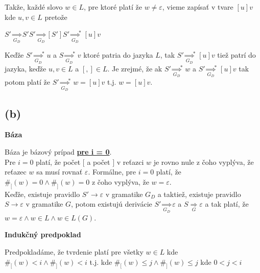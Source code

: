 \documentclass[11pt,a4paper]{article}
\begin{document}
Takže, každé slovo $w \in L$, pre ktoré platí že $w \neq \varepsilon$, vieme zapísať v tvare $[u]v$ kde $u,v \in L$ pretože

\begin{center}
$S' \underset{G_D}{\Rightarrow} S'S' \underset{G_D}{\Rightarrow} [S']S' {\underset{G_D}{\Rightarrow}}^{*} [u]v$
\end{center}

Keďže $S' {\underset{G_D}{\Rightarrow}}^* u$ a $S {\underset{G_D}{\Rightarrow}}^* v$ ktoré patria do jazyka $L$, tak $S' {\underset{G_D}{\Rightarrow}}^* [u]v$ tiež patrí do jazyka, keďže $u, v \in L$ a $[,] \in L$. Je zrejmé, že ak $S' {\underset{G_D}{\Rightarrow}}^* w$ a $S' {\underset{G_D}{\Rightarrow}}^* [u]v$ tak potom platí že $S' {\underset{G_D}{\Rightarrow}}^* w = [u]v$ t.j. $w = [u]v$.

\subsection{(b)}

\textbf{Báza}
\begin{flushright}
\begin{minipage}{0.95\textwidth}
    Báza je bázový prípad \underline{\textbf{pre i = 0}}.\\

    Pre $i=0$ platí, že počet $[$ a počet $]$ v reťazci $w$ je rovno nule z čoho vyplýva, že reťazec $w$ sa musí rovnať $\varepsilon$. Formálne, pre $i=0$ platí, že $\#_{[}(w) = 0 \wedge \#_{]}(w) = 0$ z čoho vyplýva, že $w = \varepsilon$.\\

    Keďže, existuje pravidlo $S' \rightarrow \varepsilon$ v gramatike $G_D$ a taktiež, existuje pravidlo $S \rightarrow \varepsilon$ v gramatike $G$, potom existujú derivácie $S' \underset{G_D}{\Rightarrow} \varepsilon$ a $S \underset{G}{\Rightarrow} \varepsilon$ a tak platí, že $w = \varepsilon \wedge w \in L \wedge w \in L(G)$.
\end{minipage}
\end{flushright}

\textbf{Indukčný predpoklad}
\begin{flushright}
\begin{minipage}{0.95\textwidth}
    Predpokladáme, že tvrdenie platí pre všetky $w \in L$ kde $\#_[(w) < i \wedge \#_](w) < i$ t.j. kde $\#_[(w) \leq j \wedge \#_](w) \leq j$ kde $0<j<i$\\
\end{minipage}
\end{flushright}
\end{document}
